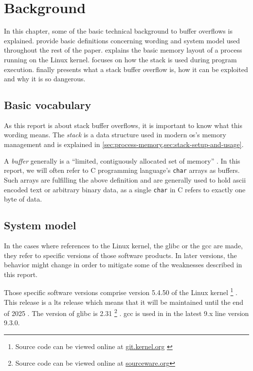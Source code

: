 \chapter{Background}
\label{chp:background}

In this chapter, some of the basic technical background to buffer overflows is explained.
 provide basic definitions concerning wording and system model used throughout the rest of the paper.
 explains the basic memory layout of a process running on the Linux kernel.
 focuses on how the stack is used during program execution.
 finally presents what a stack buffer overflow is, how it can be exploited and why it is so dangerous.

\section{Basic vocabulary}
\label{sec:basic-vocabulary}
As this report is about stack buffer overflows, it is important to know what this wording means.
The \emph{stack} is a data structure used in modern \acs{os}'s memory management and is explained in \cref{sec:process-memory,sec:stack-setup-and-usage}.

A \emph{buffer} generally is a ``limited, contiguously allocated set of memory'' \cite[12]{Anley2007}.
In this report, we will often refer to C programming language's \texttt{char} arrays as buffers.
Such arrays are fulfilling the above definition and are generally used to hold \gls{ascii} encoded text or arbitrary binary data, as a single \texttt{char} in C refers to exactly one byte of data.

\section{System model}
\label{sec:system-model}

In the cases where references to the Linux kernel, the \gls{glibc} or the \gls{gcc} are made, they refer to specific versions of those software products.
In later versions, the behavior might change in order to mitigate some of the weaknesses described in this report.

Those specific software versions comprise version 5.4.50 of the Linux kernel%
\footnote{Source code can be viewed online at \href{https://git.kernel.org/stable/h/v5.4.50}{git.kernel.org} \cite{LKD2020}}%
.
This release is a \gls{lts} release which means that it will be maintained until the end of 2025 \cite{LKO2020}.
The version of \gls{glibc} is 2.31%
\footnote{Source code can be viewed online at \href{https://sourceware.org/git/?p=glibc.git;a=tree;h=6ee690ef6fa36bf79d2e05b5a30a4f7e10ba3937;hb=9ea3686266dca3f004ba874745a4087a89682617}{sourceware.org}}%
.
\gls{gcc} is used in in the latest 9.x line version 9.3.0.

